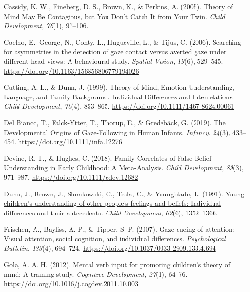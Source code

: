\documentclass[
  man,floatsintext]{apa6}
\newlength{\cslhangindent}
\newlength{\cslentryspacingunit} %
\newenvironment{CSLReferences}[2] %
 {%
  \setlength{\parindent}{0pt}
  \ifodd #1
  \let\oldpar\par
  \def\par{\hangindent=\cslhangindent\oldpar}
  \fi
  \setlength{\parskip}{#2\cslentryspacingunit}
 }%
 {}
\begin{document}
\begin{CSLReferences}{1}{0}
\leavevmode{}%
Cassidy, K. W., Fineberg, D. S., Brown, K., \& Perkins, A. (2005). Theory of {Mind May Be Contagious}, but {You Don}'t {Catch It} from {Your Twin}. \emph{Child Development}, \emph{76}(1), 97--106.

\leavevmode{}%
Coelho, E., George, N., Conty, L., Hugueville, L., \& Tijus, C. (2006). Searching for asymmetries in the detection of gaze contact versus averted gaze under different head views: A behavioural study. \emph{Spatial Vision}, \emph{19}(6), 529--545. \url{https://doi.org/10.1163/156856806779194026}

\leavevmode{}%
Cutting, A. L., \& Dunn, J. (1999). Theory of {Mind}, {Emotion Understanding}, {Language}, and {Family Background}: {Individual Differences} and {Interrelations}. \emph{Child Development}, \emph{70}(4), 853--865. \url{https://doi.org/10.1111/1467-8624.00061}

\leavevmode{}%
Del Bianco, T., Falck-Ytter, T., Thorup, E., \& Gredebäck, G. (2019). The {Developmental Origins} of {Gaze-Following} in {Human Infants}. \emph{Infancy}, \emph{24}(3), 433--454. \url{https://doi.org/10.1111/infa.12276}

\leavevmode{}%
Devine, R. T., \& Hughes, C. (2018). Family {Correlates} of {False Belief Understanding} in {Early Childhood}: {A Meta-Analysis}. \emph{Child Development}, \emph{89}(3), 971--987. \url{https://doi.org/10.1111/cdev.12682}

\leavevmode{}%
Dunn, J., Brown, J., Slomkowski, C., Tesla, C., \& Youngblade, L. (1991). \href{https://www.ncbi.nlm.nih.gov/pubmed/1786720}{Young children's understanding of other people's feelings and beliefs: Individual differences and their antecedents}. \emph{Child Development}, \emph{62}(6), 1352--1366.

\leavevmode{}%
Frischen, A., Bayliss, A. P., \& Tipper, S. P. (2007). Gaze cueing of attention: {Visual} attention, social cognition, and individual differences. \emph{Psychological Bulletin}, \emph{133}(4), 694--724. \url{https://doi.org/10.1037/0033-2909.133.4.694}

\leavevmode{}%
Gola, A. A. H. (2012). Mental verb input for promoting children's theory of mind: {A} training study. \emph{Cognitive Development}, \emph{27}(1), 64--76. \url{https://doi.org/10.1016/j.cogdev.2011.10.003}


\end{CSLReferences}
\end{document}
